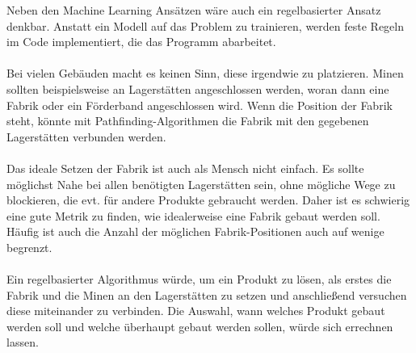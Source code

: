 Neben den Machine Learning Ansätzen wäre auch ein regelbasierter Ansatz denkbar. Anstatt ein Modell auf das Problem zu trainieren, werden feste Regeln im Code implementiert, die das Programm abarbeitet.
\\\\
Bei vielen Gebäuden macht es keinen Sinn, diese irgendwie zu platzieren. Minen sollten beispielsweise an Lagerstätten angeschlossen werden, woran dann eine Fabrik oder ein Förderband angeschlossen wird. Wenn die Position der Fabrik steht, könnte mit Pathfinding-Algorithmen die Fabrik mit den gegebenen Lagerstätten verbunden werden.
\\\\
Das ideale Setzen der Fabrik ist auch als Mensch nicht einfach. Es sollte möglichst Nahe bei allen benötigten Lagerstätten sein, ohne mögliche Wege zu blockieren, die evt. für andere Produkte gebraucht werden. Daher ist es schwierig eine gute Metrik zu finden, wie idealerweise eine Fabrik gebaut werden soll. Häufig ist auch die Anzahl der möglichen Fabrik-Positionen auch auf wenige begrenzt.
\\\\
Ein regelbasierter Algorithmus würde, um ein Produkt zu lösen, als erstes die Fabrik und die Minen an den Lagerstätten zu setzen und anschließend versuchen diese miteinander zu verbinden. 
Die Auswahl, wann welches Produkt gebaut werden soll und welche überhaupt gebaut werden sollen, würde sich errechnen lassen.  
